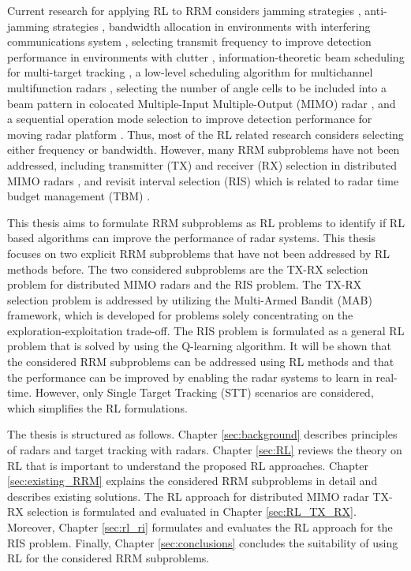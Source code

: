 \documentclass[english, 12pt, a4paper, elec, utf8, a-1b, online]{aaltothesis}
\begin{document}
Current research for applying RL to RRM considers
jamming strategies \cite{Qiang2017, Wang2019, Wang2019a, Zhang2019},
anti-jamming strategies \cite{Kang2018, Ak2019}, 
bandwidth allocation in environments with interfering communications system \cite{Selvi2018, Kozy2019},
selecting transmit frequency to improve detection performance in environments with clutter \cite{Wabeke2010}, 
information-theoretic beam scheduling for multi-target tracking \cite{Kreucher2005, Xu2010},
a low-level scheduling algorithm for multichannel multifunction radars \cite{Shaghaghi2018},
selecting the number of angle cells to be included into a beam pattern in colocated Multiple-Input Multiple-Output (MIMO) radar \cite{Wang2018}, 
and a sequential operation mode selection to improve detection performance for moving radar platform \cite{Smits2008}.
Thus, most of the RL related research considers selecting either frequency or bandwidth. 
However, many RRM subproblems have not been addressed, including transmitter (TX) and receiver (RX) selection in distributed MIMO radars \cite{Godrich2011a, Godrich2011, Sun2014}, and revisit interval selection (RIS) which is related to radar time budget management (TBM) \cite{Cohen1986, Gardner1988, Munu1992, ChengTing2007, Baek2010, Watson1993, Charlish2015, Keuk1975, Shin1995, Benoudnine2006, Esfahani2012}.

This thesis aims to formulate RRM subproblems as RL problems to identify if RL based algorithms can improve the performance of radar systems. 
This thesis focuses on two explicit RRM subproblems that have not been addressed by RL methods before. 
The two considered subproblems are the TX-RX selection problem for distributed MIMO radars and the RIS problem.
The TX-RX selection problem is addressed by utilizing the Multi-Armed Bandit (MAB) framework, which is developed for problems solely concentrating on the exploration-exploitation trade-off. 
The RIS problem is formulated as a general RL problem that is solved by using the Q-learning algorithm.
It will be shown that the considered RRM subproblems can be addressed using RL methods and that the performance can be improved by enabling the radar systems to learn in real-time.
However, only Single Target Tracking (STT) scenarios are considered, which simplifies the RL formulations. 

The thesis is structured as follows. Chapter \ref{sec:background} describes principles of radars and target tracking with radars. Chapter \ref{sec:RL} reviews the theory on RL that is important to understand the proposed RL approaches. 
Chapter \ref{sec:existing_RRM} explains the considered RRM subproblems in detail and describes existing solutions.
The RL approach for distributed MIMO radar TX-RX selection is formulated and evaluated in Chapter \ref{sec:RL_TX_RX}. Moreover,  Chapter \ref{sec:rl_ri} formulates and evaluates the RL approach for the RIS problem.
Finally, Chapter \ref{sec:conclusions} concludes the suitability of using RL for the considered RRM subproblems. 
\end{document}
